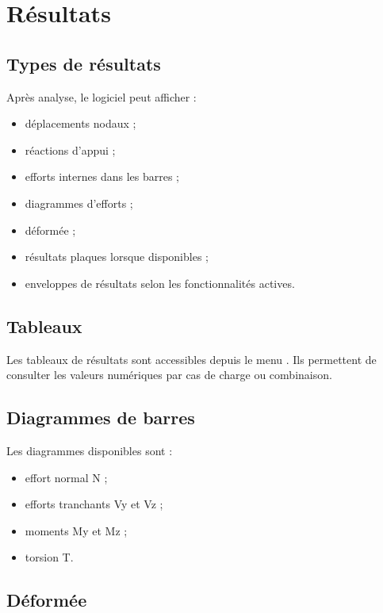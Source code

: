 \chapter{Résultats}

\section{Types de résultats}

Après analyse, le logiciel peut afficher :

\begin{itemize}
  \item déplacements nodaux ;
  \item réactions d'appui ;
  \item efforts internes dans les barres ;
  \item diagrammes d'efforts ;
  \item déformée ;
  \item résultats plaques lorsque disponibles ;
  \item enveloppes de résultats selon les fonctionnalités actives.
\end{itemize}

\section{Tableaux}

Les tableaux de résultats sont accessibles depuis le menu . Ils
permettent de consulter les valeurs numériques par cas de charge ou combinaison.

\section{Diagrammes de barres}

Les diagrammes disponibles sont :

\begin{itemize}
  \item effort normal N ;
  \item efforts tranchants Vy et Vz ;
  \item moments My et Mz ;
  \item torsion T.
\end{itemize}

\section{Déformée}

